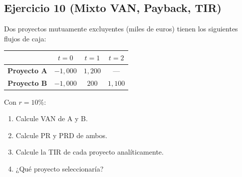 \documentclass[12pt,a4paper]{article}
\newenvironment{ejercicio}[1]{\subsection*{Ejercicio #1}}{}
\begin{document}
\begin{ejercicio}{10 (Mixto VAN, Payback, TIR)}
Dos proyectos mutuamente excluyentes (miles de euros) tienen los siguientes flujos de caja:

\begin{table}[h]
\centering
\begin{tabular}{c c c c}
\toprule
& $t=0$ & $t=1$ & $t=2$ \\
\midrule
\textbf{Proyecto A} & $-1{,}000$ & $1{,}200$ & --- \\
\textbf{Proyecto B} & $-1{,}000$ & $200$ & $1{,}100$ \\
\bottomrule
\end{tabular}
\end{table}

Con $r=10\%$:
\begin{enumerate}[label=\alph*)]
  \item Calcule VAN de A y B.
  \item Calcule PR y PRD de ambos.
  \item Calcule la TIR de cada proyecto analíticamente. 
  \item ¿Qué proyecto seleccionaría?
\end{enumerate}
\end{ejercicio}
\end{document}
